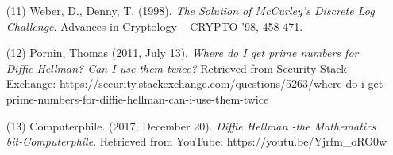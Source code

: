 \documentclass{article}
\begin{document}
\begin{itemize}
    \item[(11)]Weber, D., Denny, T. (1998). \textit{The Solution of McCurley's Discrete Log Challenge}. Advances in Cryptology -- CRYPTO '98, 458-471.
    
    \item[(12)]Pornin, Thomas (2011, July 13). \textit{Where do I get prime numbers for Diffie-Hellman? Can I use them twice?} Retrieved from Security Stack Exchange: https://security.stackexchange.com/questions/5263/where-do-i-get-prime-numbers-for-diffie-hellman-can-i-use-them-twice
    
    \item[(13)]Computerphile. (2017, December 20). \textit{Diffie Hellman -the Mathematics bit-Computerphile}. Retrieved from YouTube: https://youtu.be/Yjrfm\_oRO0w

\end{itemize}
\end{document}
